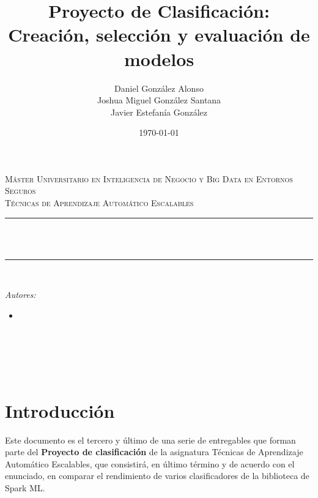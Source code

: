 \documentclass[12pt]{article}
\title{Proyecto de Clasificación: Creación, selección y evaluación de modelos}			                    %
\author{Daniel González Alonso\\		%
        Joshua Miguel González Santana\\
		Javier Estefanía González}
\date{\today}							%
\makeatletter
\let\thetitle\@title
\let\theauthor\@author
\let\thedate\@date
\makeatother
\begin{document}
\begin{titlepage}
	\centering
    \vspace*{0.25 cm}
	
	\doublespacing
	\textsc{\LARGE Máster Universitario en Inteligencia de Negocio y Big Data en Entornos Seguros}\\[0.5 cm]
	\singlespacing
	\textsc{\large Técnicas de Aprendizaje Automático Escalables}\\[0.5 cm]
	
	\rule{\linewidth}{0.2 mm}\\[0.4 cm]
	\textsc{\huge \bf \thetitle}\\
	\rule{\linewidth}{0.2 mm}\\[2.5 cm]
	
	\begin{minipage}{0.6\textwidth}
		\begin{flushleft} \large
			\emph{Autores:}\\
			\begin{itemize}
            	\item[] \theauthor
            \end{itemize}
		\end{flushleft}
	\end{minipage}~
	\begin{minipage}{0.3\textwidth}
		\begin{flushright} \large
		\end{flushright}
	\end{minipage}\\[6 cm]
	{\large \thedate}\\[2 cm]

	\vfill	
\end{titlepage}

\tableofcontents
\pagebreak

\section{Introducción}
Este documento es el tercero y último de una serie de entregables que forman parte del \textbf{Proyecto de clasificación} de la asignatura Técnicas de Aprendizaje Automático Escalables, que consistirá, en último término y de acuerdo con el enunciado, en comparar el rendimiento de varios clasificadores de la biblioteca de Spark ML.\\
\end{document}
